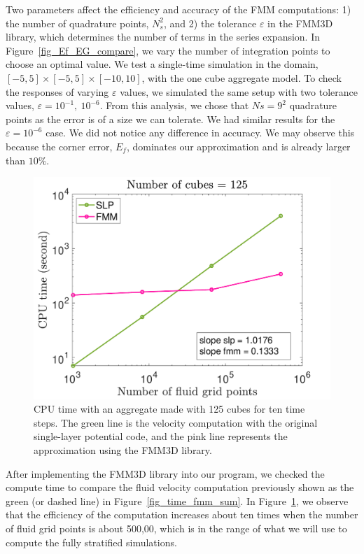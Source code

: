 \par
Two parameters affect the efficiency and accuracy of the FMM computations: 1) the number of quadrature points, $N_s^2$, and 2) the tolerance $\varepsilon$ in the FMM3D library, which determines the number of terms in the series expansion.
In Figure~\ref{fig_Ef_EG_compare}, we vary the number of integration points to choose an optimal value. 
We test a single-time simulation in the domain,  $[-5, 5] \times [-5, 5] \times [-10, 10]$,  with the one cube aggregate model. To check the responses of varying $\varepsilon$ values, we simulated the same setup with two tolerance values, $\varepsilon = 10^{-1}, \ 10^{-6}$.
From this analysis, we chose that $Ns = 9^2$ quadrature points as the error is of a size we can tolerate. We had similar results for the $\varepsilon = 10^{-6}$ case. We did not notice any difference in accuracy. We may observe this because the corner error, $E_f$, dominates our approximation and is already larger than $10 \%$. 
\begin{figure}[ht]
	\begin{center}
		\includegraphics[scale=0.4]{./figures/fig_time_both_mm5_Nt10}
	\caption{CPU time with an aggregate made with 125 cubes for ten time steps. The green line is the velocity computation with the original single-layer potential code, and the pink line represents the approximation using the FMM3D library.}
	\label{fig_vel_mm5_t1}
\end{center}
\end{figure}
After implementing the FMM3D library into our program, we checked the compute time to compare the fluid velocity computation previously shown as the green (or dashed line) in Figure~\ref{fig_time_fmm_sum}. In Figure~\ref{fig_vel_mm5_t1}, we observe that the efficiency of the computation increases about ten times when the number of fluid grid points is about 500,00, which is in the range of what we will use to compute the fully stratified simulations.
